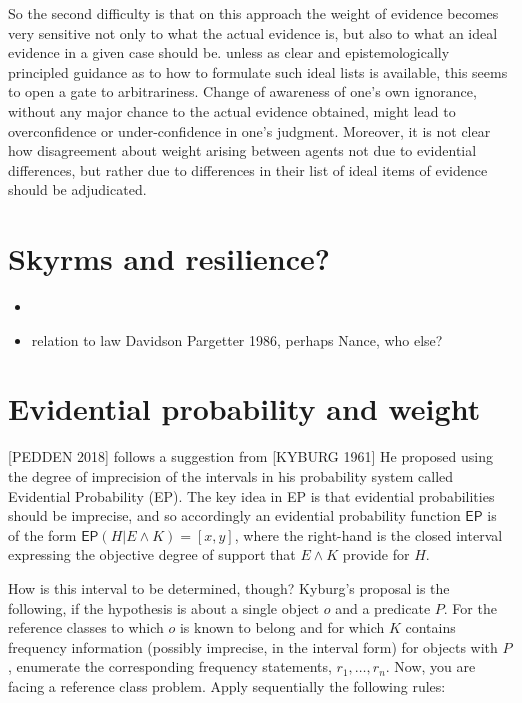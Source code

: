 \documentclass[
  10pt,
  dvipsnames,enabledeprecatedfontcommands]{scrartcl}
\providecommand{\tightlist}{%
  \setlength{\itemsep}{0pt}\setlength{\parskip}{0pt}}
\begin{document}
So the second difficulty is that on this approach the weight of evidence
becomes very sensitive not only to what the actual evidence is, but also
to what an ideal evidence in a given case should be. unless as clear and
epistemologically principled guidance as to how to formulate such ideal
lists is available, this seems to open a gate to arbitrariness. Change
of awareness of one's own ignorance, without any major chance to the
actual evidence obtained, might lead to overconfidence or
under-confidence in one's judgment. Moreover, it is not clear how
disagreement about weight arising between agents not due to evidential
differences, but rather due to differences in their list of ideal items
of evidence should be adjudicated.

\hypertarget{skyrms-and-resilience}{%
\section{Skyrms and resilience?}\label{skyrms-and-resilience}}

\begin{itemize}
\tightlist
\item
\item
  relation to law Davidson Pargetter 1986, perhaps Nance, who else?
\end{itemize}

\hypertarget{evidential-probability-and-weight}{%
\section{Evidential probability and
weight}\label{evidential-probability-and-weight}}

{[}PEDDEN 2018{]}  follows a suggestion from {[}KYBURG
1961{]} He proposed using the degree of imprecision of the
intervals in his probability system called Evidential Probability (EP).
The key idea in EP is that evidential probabilities should be imprecise,
and so accordingly an evidential probability function \(\mathsf{EP}\) is
of the form \(\mathsf{EP}(H \vert E \wedge K) = [x,y]\), where the
right-hand is the closed interval expressing the objective degree of
support that \(E\wedge K\) provide for \(H\).

How is this interval to be determined, though? Kyburg's proposal is the
following, if the hypothesis is about a single object \(o\) and a
predicate \(P\). For the reference classes to which \(o\) is known to
belong and for which \(K\) contains frequency information (possibly
imprecise, in the interval form) for objects with \(P\), enumerate the
corresponding frequency statements, \(r_1, \dots, r_n\). Now, you are
facing a reference class problem. Apply sequentially the following
rules:
\end{document}
